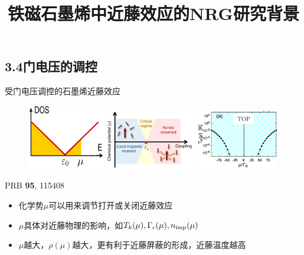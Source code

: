 \documentclass[9pt,t]{beamer} %
\begin{document}
\subsection{3.4门电压的调控}
\title{铁磁石墨烯中近藤效应的NRG研究\qquad \qquad \qquad \qquad 背景}
\begin{frame}{受门电压调控的石墨烯近藤效应}
\begin{figure}
\includegraphics[width=0.3\textwidth]{gated-dos.png}
\includegraphics[width=0.35\textwidth]{phasediagram.png}
\includegraphics[width=0.32\textwidth]{tk-mu.png}
\end{figure}
\hspace{9cm}PRB \textbf{95}, 115408
\vspace{0.7cm}
\begin{itemize}
\setlength\itemsep{0.4em}
\item 化学势$\mu$可以用来调节打开或关闭近藤效应
\item $\mu$具体对近藤物理的影响，如$T_{k}(\mu), \Gamma_{c}(\mu), n_{\rm{imp}}(\mu)$
\item $\mu$越大，$\rho(\mu)$越大，更有利于近藤屏蔽的形成，近藤温度越高
\end{itemize}
\end{frame}
\end{document}
